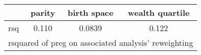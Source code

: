 \begin{tabular}{l*{3}{c}}
\toprule
            &\multicolumn{1}{c}{parity}&\multicolumn{1}{c}{birth space}&\multicolumn{1}{c}{wealth quartile}\\
\midrule
\midrule
rsq         &       0.110&      0.0839&       0.122\\
\bottomrule
\multicolumn{4}{l}{\footnotesize rsquared of preg on associated analysis' reweighting}\\
\end{tabular}
